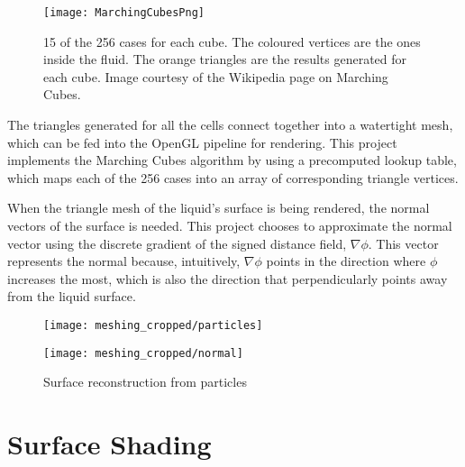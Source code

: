 \begin{figure}[H]
    \centering
    \texttt{[image: MarchingCubesPng]}
    \caption{15 of the 256 cases for each cube. The coloured vertices are the ones inside the fluid. The orange triangles are the results generated for each cube. Image courtesy of the Wikipedia page on Marching Cubes. }
    \label{figure marching cubes}
\end{figure}

The triangles generated for all the cells connect together into a watertight mesh, which can be fed into the OpenGL pipeline for rendering. This project implements the Marching Cubes algorithm by using a precomputed lookup table, which maps each of the 256 cases into an array of corresponding triangle vertices.

When the triangle mesh of the liquid's surface is being rendered, the normal vectors of the surface is needed. This project chooses to approximate the normal vector using the discrete gradient of the signed distance field, $\nabla \phi$. This vector represents the normal because, intuitively, $\nabla \phi$ points in the direction where $\phi$ increases the most, which is also the direction that perpendicularly points away from the liquid surface.



\begin{figure}[H]
    \centering
    
    \begin{minipage}[t]{.49\linewidth}
        \centering
        \vspace{0pt}
        \texttt{[image: meshing\_cropped/particles]}
    \end{minipage}
    \begin{minipage}[t]{.49\linewidth}
        \centering
        \vspace{0pt}
        \texttt{[image: meshing\_cropped/normal]}
    \end{minipage}
    
    \caption{Surface reconstruction from particles}
    \label{figure surface reconstruction}
\end{figure}




\section{Surface Shading}

